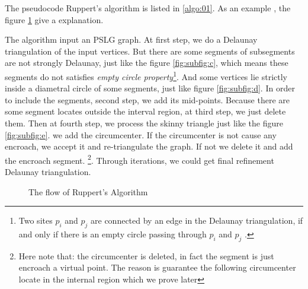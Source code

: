 \documentclass[letterpaper,12pt]{article}
\begin{document}
The pseudocode Ruppert's algorithm is listed in \ref{algo:01}. As an example , the figure
\ref{fig:01} give a explanation.

The algorithm input an PSLG graph. At first step, we do a Delaunay triangulation of the input
vertices. But there are some segments of subsegments are not strongly Delaunay, just like the figure
\ref{fig:subfig:c}, which means these segments do not satisfies \emph{empty circle
property}\footnote{Two sites $p_i$ and $p_j$ are connected by an edge in the Delaunay triangulation,
if and only if there is an empty circle passing through $p_i$ and $p_j$ .}. And some vertices lie
strictly inside a diametral circle of some segments, just like figure \ref{fig:subfig:d}. In order
to include the segments, second step, we add its mid-points. Because there are some segment locates
outside the interval region, at third step, we just delete them.  Then at fourth step, we process
the skinny triangle just like the figure \ref{fig:subfig:e}. we add the circumcenter.  If the
circumcenter is not cause any encroach, we accept it and re-triangulate the graph. If not we delete
it and add the encroach segment. \footnote{Here note that: the circumcenter is deleted, in fact the
segment is just encroach a virtual point. The reason is guarantee the following circumcenter locate
in the internal region which we prove later}.  Through iterations, we could get final refinement
Delaunay triangulation.



\begin{figure}[!htb] \centering

    


    

    

  \caption{The flow of Ruppert's Algorithm}
  \label{fig:01}
\end{figure}
\end{document}
